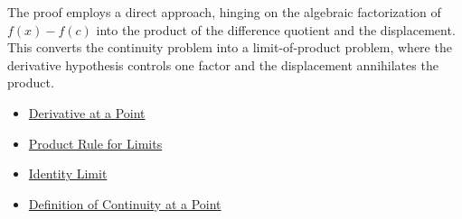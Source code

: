 \begin{remark*}
The proof employs a direct approach, hinging on the algebraic factorization of $f(x) - f(c)$ into the product of the difference quotient and the displacement. This converts the continuity problem into a limit-of-product problem, where the derivative hypothesis controls one factor and the displacement annihilates the product.
\end{remark*}

\begin{dependencies}
\begin{itemize}
  \item \hyperref[def:derivative-at-a-point]{Derivative at a Point}
  \item \hyperref[prop:limit-product-rule]{Product Rule for Limits}
  \item \hyperref[prop:identity-limit]{Identity Limit}
  \item \hyperref[def:continuity]{Definition of Continuity at a Point}
\end{itemize}
\end{dependencies}

\clearpage

